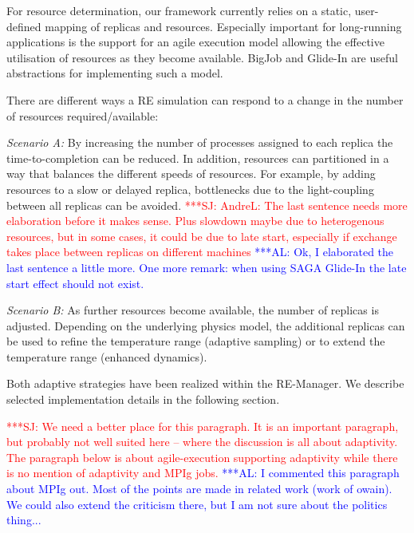 \documentclass{rspublic}
\newcommand{\alnote}[1]{ {\textcolor{blue} { ***AL: #1 }}}
\newcommand{\jhanote}[1]{ {\textcolor{red} { ***SJ: #1 }}}
\newcommand{\alnote}[1]{}
\newcommand{\jhanote}[1]{}
\begin{document}
For resource determination, our framework currently relies on 
a static, user-defined mapping of replicas and resources. Especially 
important for long-running applications is the support
for an agile execution model allowing the effective utilisation of
resources as they become available. BigJob and Glide-In are useful
abstractions for implementing such a model.

There are different ways a RE simulation can respond to a change in
the number of resources required/available:
\begin{compactitem}         
\item {\it Scenario A:} By increasing the number of processes assigned to each
  replica the time-to-completion can be reduced. In addition, resources
  can partitioned in a way that balances the different speeds of resources.
  For example, by adding resources to
  a slow or delayed replica, bottlenecks due to the light-coupling
  between all replicas can be avoided.  
  \jhanote{AndreL: The last sentence needs more elaboration
    before it makes sense. Plus slowdown maybe due to heterogenous
    resources, but in some cases, it could be due to late start,
    especially if exchange takes place between replicas on different
    machines}   
   \alnote{Ok, I elaborated the last sentence a little more. One more remark:
    when using SAGA Glide-In the late start effect should not exist.}

    \item {\it Scenario B:} As further resources become available, 
    the number of replicas is adjusted. Depending on the 
    underlying physics model, the additional replicas can be used
    to refine the temperature range (adaptive sampling) or to extend the
    temperature range (enhanced dynamics).
\end{compactitem}           
Both adaptive strategies have been realized within the RE-Manager. We
describe selected implementation details in the following section.

\jhanote{We need a better place for this paragraph. It is an important
  paragraph, but probably not well suited here -- where the discussion
  is all about adaptivity. The paragraph below is about
  agile-execution supporting adaptivity while there is no mention of
  adaptivity and MPIg jobs.}
\alnote{I commented this paragraph about MPIg out. Most of the points are
made in related work (work of owain). We could also extend the criticism
there, but I am not sure about the politics thing...}  
\end{document}
